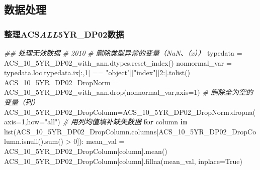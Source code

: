 \documentclass[
]{article}
\newenvironment{Shaded}{}{}
\newcommand{\BuiltInTok}[1]{#1}
\newcommand{\CommentTok}[1]{\textcolor[rgb]{0.38,0.63,0.69}{\textit{#1}}}
\newcommand{\ControlFlowTok}[1]{\textcolor[rgb]{0.00,0.44,0.13}{\textbf{#1}}}
\newcommand{\DecValTok}[1]{\textcolor[rgb]{0.25,0.63,0.44}{#1}}
\newcommand{\KeywordTok}[1]{\textcolor[rgb]{0.00,0.44,0.13}{\textbf{#1}}}
\newcommand{\NormalTok}[1]{#1}
\newcommand{\OperatorTok}[1]{\textcolor[rgb]{0.40,0.40,0.40}{#1}}
\newcommand{\StringTok}[1]{\textcolor[rgb]{0.25,0.44,0.63}{#1}}
\newcommand{\VariableTok}[1]{\textcolor[rgb]{0.10,0.09,0.49}{#1}}
\begin{document}
\hypertarget{header-n204}{%
\subsection{数据处理}\label{header-n204}}

\hypertarget{header-n205}{%
\subsubsection{\texorpdfstring{整理ACS\emph{ALL}5YR\_DP02数据}{整理ACSALL5YR\_DP02数据}}\label{header-n205}}

\begin{Shaded}
\begin{Highlighting}[]
\CommentTok{\#\#  处理无效数据}
\CommentTok{\# 2010}
\CommentTok{\# 删除类型异常的变量（NaN、（x））}
\NormalTok{typedata }\OperatorTok{=}\NormalTok{ ACS\_10\_5YR\_DP02\_with\_ann.dtypes.reset\_index()}
\NormalTok{nonnormal\_var }\OperatorTok{=}\NormalTok{ typedata.loc[typedata.ix[:,}\DecValTok{1}\NormalTok{] }\OperatorTok{==} \StringTok{"object"}\NormalTok{][}\StringTok{"index"}\NormalTok{][}\DecValTok{2}\NormalTok{:].tolist()}
\NormalTok{ACS\_10\_5YR\_DP02\_DropNorm }\OperatorTok{=}\NormalTok{ ACS\_10\_5YR\_DP02\_with\_ann.drop(nonnormal\_var,axis}\OperatorTok{=}\DecValTok{1}\NormalTok{)}
\CommentTok{\# 删除全为空的变量（列）}
\NormalTok{ACS\_10\_5YR\_DP02\_DropColumn}\OperatorTok{=}\NormalTok{ACS\_10\_5YR\_DP02\_DropNorm.dropna(axis}\OperatorTok{=}\DecValTok{1}\NormalTok{,how}\OperatorTok{=}\StringTok{"all"}\NormalTok{)}
\CommentTok{\# 用列均值填补缺失数据}
\ControlFlowTok{for}\NormalTok{ column }\KeywordTok{in} \BuiltInTok{list}\NormalTok{(ACS\_10\_5YR\_DP02\_DropColumn.columns[ACS\_10\_5YR\_DP02\_DropColumn.isnull().}\BuiltInTok{sum}\NormalTok{() }\OperatorTok{\textgreater{}} \DecValTok{0}\NormalTok{]):}
\NormalTok{    mean\_val }\OperatorTok{=}\NormalTok{ ACS\_10\_5YR\_DP02\_DropColumn[column].mean()}
\NormalTok{    ACS\_10\_5YR\_DP02\_DropColumn[column].fillna(mean\_val, inplace}\OperatorTok{=}\VariableTok{True}\NormalTok{)}


\end{Highlighting}
\end{Shaded}
\end{document}
